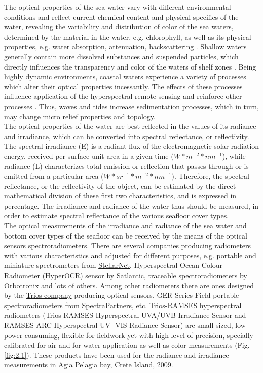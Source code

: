 \documentclass[10pt, a4paper]{article}
\begin{document}
The optical properties of the sea water vary with different environmental conditions and reflect
current chemical content and physical specifics of the water, revealing the variability and distribution
of color of the sea waters, determined by the material in the water, e.g. chlorophyll, as well as its
physical properties, e.g. water absorption, attenuation, backscattering \cite{Maffione01a}\label{Maffione01a}.
Shallow waters generally contain more dissolved substances and suspended particles, which directly
influences the transparency and color of the waters of shelf zones \cite{Jerlov52}\label{Jerlov52}. Being highly
dynamic environments, coastal waters experience a variety of processes which alter their optical
properties incessantly. The effects of these processes influence application of the hyperspectral
remote sensing and reinforce other processes \cite{Maffione01b}\label{Maffione01b}. Thus, waves and tides increase
sedimentation processes, which in turn, may change micro relief properties and topology. \\
The optical properties of the water are best reflected in the values of its radiance and irradiance,
which can be converted into spectral reflectance, or reflectivity. The spectral irradiance (E) is a
radiant flux of the electromagnetic solar radiation energy, received per surface unit area in a given
time ($W*m^{−2}*nm^{−1}$), while radiance (L) characterizes total emission or reflection that passes through
or is emitted from a particular area ($W*sr^{−1}*m^{−2}*nm^{−1}$). Therefore, the spectral reflectance, or the
reflectivity of the object, can be estimated by the direct mathematical division of these first two
characteristics, and is expressed in percentage.
The irradiance and radiance of the water thus should be measured, in order to estimate spectral
reflectance of the various seafloor cover types. \\
The optical measurements of the irradiance and radiance of the sea water and bottom cover types of the seafloor can be received by the means of the
optical sensors spectroradiometers. There are several companies producing radiometers with various
characteristics and adjusted for different purposes, e.g. portable and miniature spectrometers from
\href{http://www.stellarnet.us}{StellarNet}, Hyperspectral Ocean Colour Radiometer (HyperOCR) sensor by
\href{http://www.satlantic.com}{Satlantic}, traceable spectroradiometers by \href{http://www.orboptronix.com}{Orbotronix} 
and lots of others. Among other radiometers there are ones designed by the \href{http://www.trios.de/}{Trios company} producing
optical sensors, GER-Series Field portable spectroradiometers from
\href{http://www.spectrapartners.nl/}{SpectraPartners}, etc. Trios-RAMSES hyperspectral radiometers
(Trios-RAMSES Hyperspectral UVA/UVB Irradiance Sensor and RAMSES-ARC Hyperspectral UV-
VIS Radiance Sensor) are small-sized, low power-consuming, flexible for fieldwork yet with high
level of precision, specially calibrated for air and for water application as well as color
measurements  (Fig.\ref{fig:2.1}). These products have been used for the radiance and irradiance
measurements in Agia Pelagia bay, Crete Island, 2009.
\end{document}
